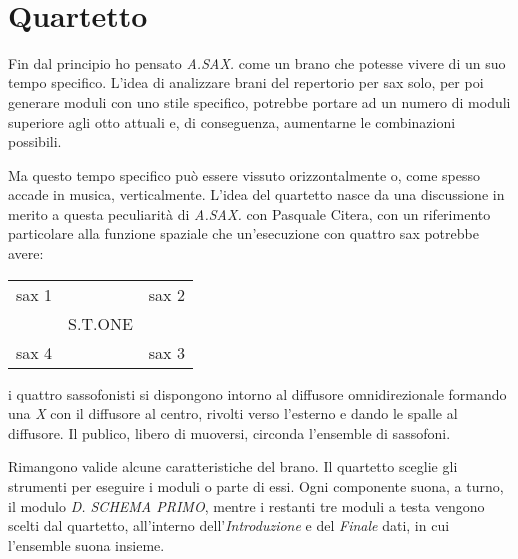 \documentclass[10pt, a4paper, twoside]{book}
\begin{document}
~



\clearpage

	\fontsize{81}{10}
	
	\fontsize{19}{10}

\fontsize{10}{12}\selectfont{}

\section*{Quartetto}

\begin{multicols}{2}
Fin dal principio ho pensato \emph{A.SAX.} come un brano che potesse vivere di un suo tempo specifico. L'idea di analizzare brani del repertorio per sax solo, per poi generare moduli con uno stile specifico, potrebbe portare ad un numero di moduli superiore agli otto attuali e, di conseguenza, aumentarne le combinazioni possibili. 

Ma questo tempo specifico può essere vissuto orizzontalmente o, come spesso accade in musica, verticalmente. L'idea del quartetto nasce da una discussione in merito a questa peculiarità di \emph{A.SAX.} con Pasquale Citera, con un riferimento particolare alla funzione spaziale che un'esecuzione con quattro sax potrebbe avere:

\setlength{\tabcolsep}{12pt}
\renewcommand{\arraystretch}{3}

\begin{center}
\begin{tabular}{c c c}

sax 1 & & sax 2 \\
& S.T.ONE & \\
sax 4 & & sax 3 \\

\end{tabular}
\end{center}
\bigskip

i quattro sassofonisti si dispongono intorno al diffusore omnidirezionale formando una \emph{X} con il diffusore al centro, rivolti verso l'esterno e dando le spalle al diffusore. Il publico, libero di muoversi, circonda l'ensemble di sassofoni. 

Rimangono valide alcune caratteristiche del brano. Il quartetto sceglie gli strumenti per eseguire i moduli o parte di essi. Ogni componente suona, a turno, il modulo \emph{D. SCHEMA PRIMO}, mentre i restanti tre moduli a testa vengono scelti dal quartetto, all'interno dell'\emph{Introduzione} e del \emph{Finale} dati, in cui l'ensemble suona insieme. 


\end{multicols}
\end{document}

